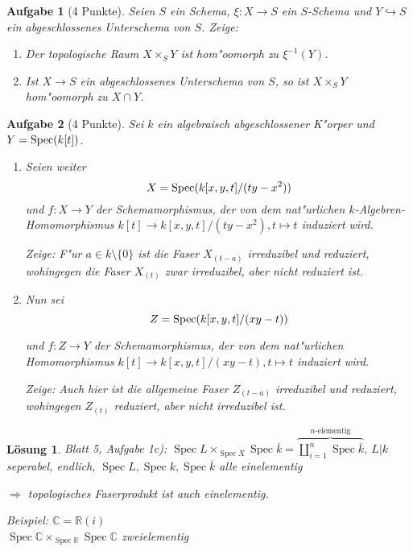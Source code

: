 \documentclass[paper = A4, fontsize=12pt, numbers=noendperiod, chapterprefix=true]{scrbook}
\theoremstyle{break}
\newtheorem{Aufg}{Aufgabe}
\newtheorem{Loes}{L\"osung}
\theoremstyle{nonumberbreak}
\theoremstyle{nonumberplain}
\DeclareMathOperator{\Spec}{Spec}
\newcommand{\C}{\mathbb{C}}
\newcommand{\R}{\mathbb{R}}
\newcommand{\X}{\times}
\begin{document}
\begin{Aufg}[4 Punkte]
Seien $S$ ein Schema, $\xi \colon X \to S$ ein $S$-Schema und $Y \hookrightarrow S$ ein abgeschlossenes Unterschema von $S$. Zeige:
\begin{enumerate}%
 \item Der topologische Raum $X \times_S Y$ ist hom"oomorph zu $\xi^{-1}(Y)$.
 \item Ist $X \to S$ ein abgeschlossenes Unterschema von $S$, so ist $X \times_S Y$ hom"oomorph zu $X \cap Y$.
\end{enumerate}
\end{Aufg}


\begin{Aufg}[4 Punkte]
Sei $k$ ein algebraisch abgeschlossener K"orper und $Y = \textup{Spec}(k[t])$.
\begin{enumerate}%
\item Seien weiter 
$$X = \textup{Spec}(k[x,y,t]/(ty-x^2))$$
und $f\colon X \rightarrow Y$ der Schemamorphismus, der von dem nat"urlichen $k$-Algebren-Homomorphismus $k[t] \rightarrow k[x,y,t]/(ty-x^2), t \mapsto t$ induziert wird.

Zeige: F"ur $a \in k \setminus\{0\}$ ist die Faser $X_{(t-a)}$ irreduzibel und reduziert, wohingegen die Faser $X_{(t)}$ zwar irreduzibel, aber nicht reduziert ist.
\item Nun sei
$$Z =\textup{Spec}(k[x,y,t]/(xy-t))$$

 und $f \colon Z \to Y$ der Schemamorphismus, der von dem nat"urlichen Homomorphismus ${k[t] \rightarrow k[x,y,t]/(xy-t)}, t \mapsto t$ induziert wird. 
 
 Zeige:
Auch hier ist die allgemeine Faser $Z_{(t-a)}$ irreduzibel und reduziert, wohingegen $Z_{(t)}$ reduziert, aber nicht irreduzibel ist.
\end{enumerate}
\end{Aufg}

\begin{Loes}
\emph{Blatt 5, Aufgabe 1c):} $\Spec L \X_{\Spec X} \Spec \overline k = \overbrace{\coprod\limits_{i=1}^n \Spec \overline k}^{n\text{-elementig}}$, $L|k$ seperabel, endlich, $\Spec L, \Spec k, \Spec \overline k$ alle einelementig

$\Rightarrow $ topologisches Faserprodukt ist auch einelementig.

\emph{Beispiel:} $\C = \R(i)$\\
$\Spec \C \X_{\Spec \R} \Spec \C$ zweielementig
\end{Loes}
\end{document}
